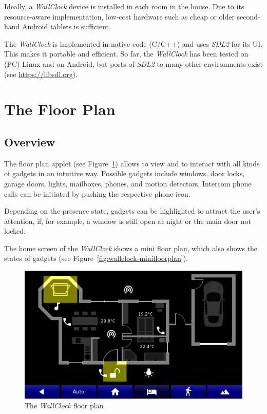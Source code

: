 \documentclass[12pt,english,parskip=half,headheight=19pt]{scrreprt}
\begin{document}
Ideally, a \textit{WallClock} device is installed in each room in the house. Due to its resource-aware implementation, low-cost hardware such as cheap or older second-hand Android tablets is sufficient.

The \textit{WallClock} is implemented in native code (C/C++) and uses \textit{SDL2} for its UI. This makes it portable and efficient. So far, the \textit{WallClock} has been tested on (PC) Linux and on Android, but ports of \textit{SDL2} to many other environments exist (see \url{https://libsdl.org}).





\section{The Floor Plan}
\label{sec:wallclock-floorplan}

\subsection{Overview}

The floor plan applet (see Figure~\ref{fig:wallclock-floorplan}) allows to view and to interact with all kinds of gadgets in an intuitive way. Possible gadgets include windows, door locks, garage doors, lights, mailboxes, phones, and motion detectors. Intercom phone calls can be initiated by pushing the respective phone icon.

Depending on the presence state, gadgets can be highlighted to attract the user's attention, if, for example, a window is still open at night or the main door not locked.

The home screen of the \textit{WallClock} shows a mini floor plan, which also shows the states of gadgets (see Figure~\ref{fig:wallclock-minifloorplan}).

\begin{figure}[ht]
  \centering
  \includegraphics[width=0.7\linewidth]{figs/wallclock-floorplan-4-night.png}
  \caption[l]{The \textit{WallClock} floor plan}
  \label{fig:wallclock-floorplan}
\end{figure}
\end{document}
